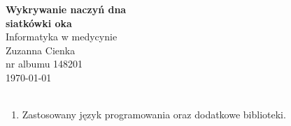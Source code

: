 \documentclass{article}
\begin{document}
\begin{center}\vspace{-1cm}
    \textbf{ \Huge Wykrywanie naczyń dna \\siatkówki oka}\\
    \LARGE Informatyka w medycynie\\
    \Large Zuzanna Cienka  \\
    \large nr albumu 148201\\
    \large \today \\~\\
\end{center}

\begin{enumerate}

    \item Zastosowany język programowania oraz dodatkowe biblioteki.
          \begin{itemize}
            

\end{itemize}
\end{enumerate}
\end{document}
